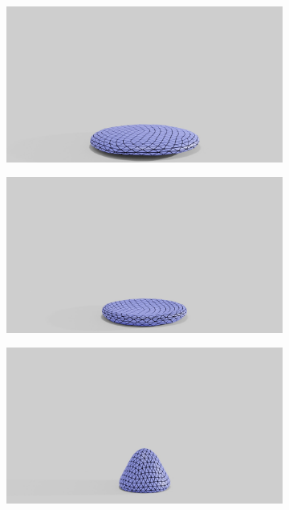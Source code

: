 \begin{figure}
	\begin{subfigure}{.16\linewidth}
		\centering
		{\includegraphics[width=2.0\textwidth]{images/coarse_ball/045/0300.jpg}}
		\label{sfig:ball-045-3}
	\end{subfigure}%
	\begin{subfigure}{.16\linewidth}
		\centering
		{\includegraphics[width=2.0\textwidth]{images/coarse_ball/045/0350.jpg}}
		\label{sfig:ball-045-4}
	\end{subfigure}%
	\begin{subfigure}{.16\linewidth}
		\centering
		{\includegraphics[width=2.0\textwidth]{images/coarse_ball/045/0400.jpg}}

\end{subfigure}
\end{figure}
